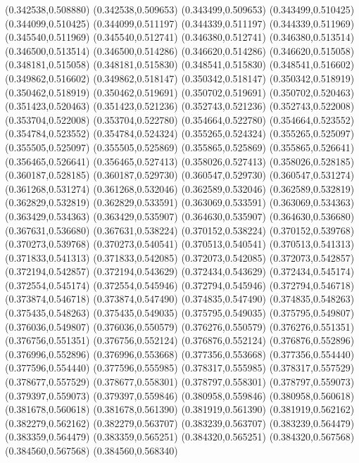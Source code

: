 (0.342538,0.508880)
(0.342538,0.509653)
(0.343499,0.509653)
(0.343499,0.510425)
(0.344099,0.510425)
(0.344099,0.511197)
(0.344339,0.511197)
(0.344339,0.511969)
(0.345540,0.511969)
(0.345540,0.512741)
(0.346380,0.512741)
(0.346380,0.513514)
(0.346500,0.513514)
(0.346500,0.514286)
(0.346620,0.514286)
(0.346620,0.515058)
(0.348181,0.515058)
(0.348181,0.515830)
(0.348541,0.515830)
(0.348541,0.516602)
(0.349862,0.516602)
(0.349862,0.518147)
(0.350342,0.518147)
(0.350342,0.518919)
(0.350462,0.518919)
(0.350462,0.519691)
(0.350702,0.519691)
(0.350702,0.520463)
(0.351423,0.520463)
(0.351423,0.521236)
(0.352743,0.521236)
(0.352743,0.522008)
(0.353704,0.522008)
(0.353704,0.522780)
(0.354664,0.522780)
(0.354664,0.523552)
(0.354784,0.523552)
(0.354784,0.524324)
(0.355265,0.524324)
(0.355265,0.525097)
(0.355505,0.525097)
(0.355505,0.525869)
(0.355865,0.525869)
(0.355865,0.526641)
(0.356465,0.526641)
(0.356465,0.527413)
(0.358026,0.527413)
(0.358026,0.528185)
(0.360187,0.528185)
(0.360187,0.529730)
(0.360547,0.529730)
(0.360547,0.531274)
(0.361268,0.531274)
(0.361268,0.532046)
(0.362589,0.532046)
(0.362589,0.532819)
(0.362829,0.532819)
(0.362829,0.533591)
(0.363069,0.533591)
(0.363069,0.534363)
(0.363429,0.534363)
(0.363429,0.535907)
(0.364630,0.535907)
(0.364630,0.536680)
(0.367631,0.536680)
(0.367631,0.538224)
(0.370152,0.538224)
(0.370152,0.539768)
(0.370273,0.539768)
(0.370273,0.540541)
(0.370513,0.540541)
(0.370513,0.541313)
(0.371833,0.541313)
(0.371833,0.542085)
(0.372073,0.542085)
(0.372073,0.542857)
(0.372194,0.542857)
(0.372194,0.543629)
(0.372434,0.543629)
(0.372434,0.545174)
(0.372554,0.545174)
(0.372554,0.545946)
(0.372794,0.545946)
(0.372794,0.546718)
(0.373874,0.546718)
(0.373874,0.547490)
(0.374835,0.547490)
(0.374835,0.548263)
(0.375435,0.548263)
(0.375435,0.549035)
(0.375795,0.549035)
(0.375795,0.549807)
(0.376036,0.549807)
(0.376036,0.550579)
(0.376276,0.550579)
(0.376276,0.551351)
(0.376756,0.551351)
(0.376756,0.552124)
(0.376876,0.552124)
(0.376876,0.552896)
(0.376996,0.552896)
(0.376996,0.553668)
(0.377356,0.553668)
(0.377356,0.554440)
(0.377596,0.554440)
(0.377596,0.555985)
(0.378317,0.555985)
(0.378317,0.557529)
(0.378677,0.557529)
(0.378677,0.558301)
(0.378797,0.558301)
(0.378797,0.559073)
(0.379397,0.559073)
(0.379397,0.559846)
(0.380958,0.559846)
(0.380958,0.560618)
(0.381678,0.560618)
(0.381678,0.561390)
(0.381919,0.561390)
(0.381919,0.562162)
(0.382279,0.562162)
(0.382279,0.563707)
(0.383239,0.563707)
(0.383239,0.564479)
(0.383359,0.564479)
(0.383359,0.565251)
(0.384320,0.565251)
(0.384320,0.567568)
(0.384560,0.567568)
(0.384560,0.568340)
